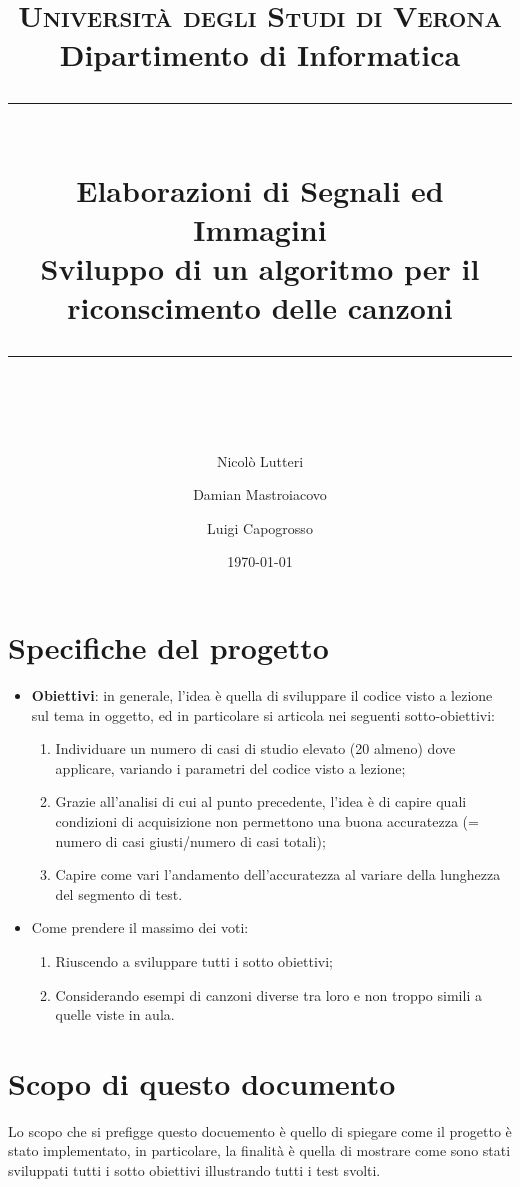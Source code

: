 \documentclass[a4paper, 12pt]{article}
\begin{document}
\title{%
    \normalfont \normalsize %
    \Large\textsc{Università degli Studi di Verona} \\ %
    {Dipartimento di Informatica} \\ [25pt] %
    \rule{\linewidth}{0.5pt} \\ [0.4cm] %
    \huge Elaborazioni di Segnali ed Immagini \\ %
    \Large Sviluppo di un algoritmo per il riconscimento delle canzoni
    \rule{\linewidth}{2pt} \\ [0.5cm] %
}
\author{Nicolò Lutteri \and Damian Mastroiacovo \and Luigi Capogrosso}
\date{\today}
\maketitle

\tableofcontents

\newpage

\section{Specifiche del progetto}
\begin{itemize}
\item \textbf{Obiettivi}: in generale, l'idea è quella di sviluppare il codice visto a lezione sul tema in oggetto, ed in particolare si articola nei seguenti sotto-obiettivi:
\begin{enumerate}
\item Individuare un numero di casi di studio elevato (20 almeno) dove applicare, variando i parametri del codice visto a lezione;
\item Grazie all'analisi di cui al punto precedente, l'idea è di capire quali condizioni di acquisizione non permettono una buona accuratezza (= numero di casi giusti/numero di casi totali);
\item Capire come vari l'andamento dell'accuratezza al variare della lunghezza del segmento di test.
\end{enumerate}
\item Come prendere il massimo dei voti:
\begin{enumerate}
\item Riuscendo a sviluppare tutti i sotto obiettivi;
\item Considerando esempi di canzoni diverse tra loro e non troppo simili a quelle viste in aula.
\end{enumerate}
\end{itemize}

\section{Scopo di questo documento}
Lo scopo che si prefigge questo docuemento è quello di spiegare come il progetto è stato implementato, in particolare, la finalità è quella di mostrare come sono stati sviluppati tutti i sotto obiettivi illustrando tutti i test svolti.
\end{document}
